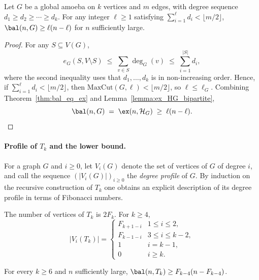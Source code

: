\begin{theorem}\label{thm:bal_general_lower}
    Let $G$ be a global amoeba on $k$ vertices and $m$ edges, with degree sequence $d_1\geq d_2\geq\cdots\geq d_k$.
    For any integer $\ell\geq 1$ satisfying $\sum_{i=1}^\ell d_i<\lfloor m/2\rfloor$, $\bal(n,G)\geq\ell(n-\ell)$ for $n$ sufficiently large.
\end{theorem}

\begin{proof}
    For any $S\subseteq V(G)$,
    $$
        e_G(S,V\setminus S)\;\leq\;\sum_{v\in S}\deg_G(v)\;\leq\;\sum_{i=1}^{|S|}d_i,
    $$
    where the second inequality uses that $d_1,\dots,d_k$ is in non-increasing order.
    Hence, if $\sum_{i=1}^\ell d_i<\lfloor m/2\rfloor$, then $\mathrm{MaxCut}(G,\ell)<\lfloor m/2\rfloor$, so $\ell\leq\ell_G$.
    Combining Theorem~\ref{thm:bal_eq_ex} and Lemma~\ref{lemma:ex_HG_bipartite},
    $$
        \bal(n,G)\;=\;\ex(n,\mathcal H_G)\;\geq\;\ell(n-\ell).
    $$
\end{proof}

\paragraph{Profile of $T_k$ and the lower bound.}

For a graph $G$ and $i\geq 0$, let $V_i(G)$ denote the set of vertices of $G$ of degree $i$, and call the sequence $(|V_i(G)|)_{i\geq 0}$ the \emph{degree profile} of $G$.
By induction on the recursive construction of $T_k$ one obtains an explicit description of its degree profile in terms of Fibonacci numbers.

\begin{lemma}\label{lemma:profile_Tk}
    The number of vertices of $T_k$ is $2F_k$.
    For $k\geq 4$,
    $$
        |V_i(T_k)|=
        \begin{cases}
            F_{k+1-i} & 1\leq i\leq 2,\\
            F_{k-1-i} & 3\leq i\leq k-2,\\
            1 & i=k-1,\\
            0 & i\geq k.
        \end{cases}
    $$
\end{lemma}

\begin{proposition}\label{prop:bal_Tk_lower}
    For every $k\geq 6$ and $n$ sufficiently large, $\bal(n,T_k)\geq F_{k-4}(n-F_{k-4})$.
\end{proposition}

